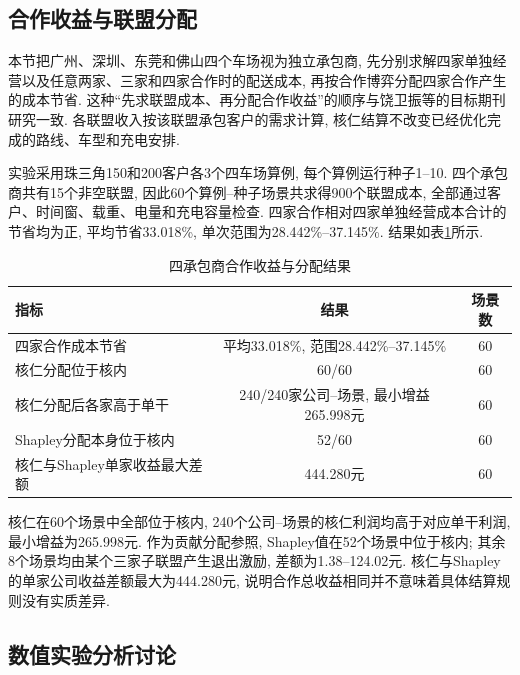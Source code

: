 \documentclass{setp-new}
\newcommand{\setptabsetup}{\fontsize{9pt}{10.5pt}\selectfont\renewcommand{\arraystretch}{0.95}\setlength{\tabcolsep}{2.2pt}\setlength{\aboverulesep}{0.4pt}\setlength{\belowrulesep}{0.4pt}\hbadness=10000}
\begin{document}
\subsection{合作收益与联盟分配}

本节把广州、深圳、东莞和佛山四个车场视为独立承包商,
先分别求解四家单独经营以及任意两家、三家和四家合作时的配送成本,
再按合作博弈分配四家合作产生的成本节省.
这种“先求联盟成本、再分配合作收益”的顺序与饶卫振等\cite{ref:91,ref:92}的目标期刊研究一致.
各联盟收入按该联盟承包客户的需求计算,
核仁结算不改变已经优化完成的路线、车型和充电安排.

实验采用珠三角150和200客户各3个四车场算例, 每个算例运行种子1--10.
四个承包商共有15个非空联盟, 因此60个算例--种子场景共求得900个联盟成本,
全部通过客户、时间窗、载重、电量和充电容量检查.
四家合作相对四家单独经营成本合计的节省均为正,
平均节省33.018\%, 单次范围为28.442\%--37.145\%.
结果如表\ref{tab:e6-summary}所示.

\begin{table}[H]
\centering
\caption{四承包商合作收益与分配结果}
\label{tab:e6-summary}
\setptabsetup
\begin{tabular*}{\linewidth}{@{\extracolsep{\fill}}lcc@{}}
\toprule
指标 & 结果 & 场景数\\
\midrule
四家合作成本节省 & 平均33.018\%, 范围28.442\%--37.145\% & 60\\
核仁分配位于核内 & 60/60 & 60\\
核仁分配后各家高于单干 & 240/240家公司--场景, 最小增益265.998元 & 60\\
Shapley分配本身位于核内 & 52/60 & 60\\
核仁与Shapley单家收益最大差额 & 444.280元 & 60\\
\bottomrule
\end{tabular*}
\end{table}

核仁在60个场景中全部位于核内,
240个公司--场景的核仁利润均高于对应单干利润, 最小增益为265.998元.
作为贡献分配参照, Shapley值在52个场景中位于核内;
其余8个场景均由某个三家子联盟产生退出激励, 差额为1.38--124.02元.
核仁与Shapley的单家公司收益差额最大为444.280元,
说明合作总收益相同并不意味着具体结算规则没有实质差异.

\subsection{数值实验分析讨论}
\end{document}
